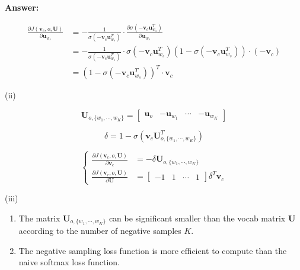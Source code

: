 \documentclass{article}
\newenvironment{answer}{
    {\bf Answer:} \sf \begingroup\color{red}
}{\endgroup}%
\begin{document}
\begin{enumerate}[label=(\alph*)]
\begin{shaded}
\begin{answer}
    \begin{equation}
        \begin{align}
            \frac{\partial{J(\bm v_c,o,\bm U)}}{\partial{\bm u_{w_s}}} &= - \frac{1}{ \sigma(-\bm v_c\bm u_{w_s}^T)}\cdot\frac{\partial{ \sigma(-\bm v_c\bm u_{w_s}^T)}}{\partial{\bm u_{w_s}}} \\
            &= - \frac{1}{ \sigma(-\bm v_c\bm u_{w_s}^T)}\cdot \sigma(-\bm v_c\bm u_{w_s}^T) \left(1-\sigma(-\bm v_c\bm u_{w_s}^T)\right) \cdot (-\bm v_c) \\
            &= \left(1-\sigma(-\bm v_c\bm u_{w_s}^T)\right)^T \cdot \bm v_c
        \end{align}\label{eq:1g3}
    \end{equation}

    (ii)

    \begin{equation}
        \bm U_{o,\{w_1,\cdots,w_K\}}=
        \begin{bmatrix}
            \bm u_o & -\bm u_{w_1} & \cdots & -\bm u_{w_K}
        \end{bmatrix}\label{eq:1g4}
    \end{equation}

    \begin{equation}
        \delta = 1-\sigma(\bm v_c\bm U_{o,\{w_1,\cdots,w_K\}}^T)\label{eq:1g5}
    \end{equation}

    \begin{equation}
        \begin{cases}
            \frac{\partial{J(\bm v_c,o,\bm U)}}{\partial{\bm v_c}} & = -\delta \bm U_{o,\{w_1,\cdots,w_K\}}\\
            \frac{\partial{J(\bm v_c,o,\bm U)}}{\partial{\bm U}} & = \begin{bmatrix}-1 & 1 & \cdots & 1\end{bmatrix} \delta^T \bm v_c
        \end{cases}\label{eq:1g6}
    \end{equation}

    (iii)

    \begin{enumerate}
        \item The matrix $\bm U_{o,\{w_1,\cdots,w_K\}}$ can be significant smaller than the vocab matrix $\bm U$ according to the number of negative samples $K$.
        \item The negative sampling loss function is more efficient to compute than the naive softmax loss function.
    \end{enumerate}


\end{answer}
\end{shaded}
\end{enumerate}
\end{document}
